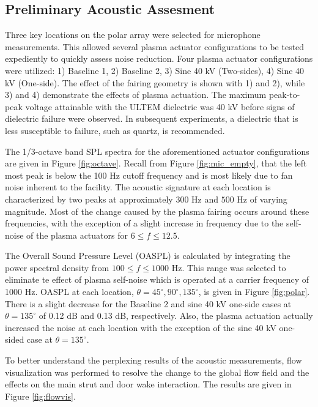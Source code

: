 \subsection{Preliminary Acoustic Assesment}
Three key locations on the polar array were selected for microphone measurements. This allowed several plasma actuator configurations to be tested expediently to quickly assess noise reduction. Four plasma actuator configurations were utilized: 1) Baseline 1, 2) Baseline 2, 3) Sine 40 kV (Two-sides), 4) Sine 40 kV (One-side). The effect of the fairing geometry is shown with 1) and 2), while 3) and 4) demonstrate the effects of plasma actuation. The maximum peak-to-peak voltage attainable with the ULTEM dielectric was 40 kV before signs of dielectric failure were observed. In subsequent experiments, a dielectric that is less susceptible to failure, such as quartz, is recommended. 

The 1/3-octave band SPL spectra for the aforementioned actuator configurations are given in Figure \ref{fig:octave}. Recall from Figure \ref{fig:mic_empty}, that the left most peak is below the 100 Hz cutoff frequency and is most likely due to fan noise inherent to the facility. The acoustic signature at each location is characterized by two peaks at approximately $300$ Hz and $500$ Hz of varying magnitude. Most of the change caused by the plasma fairing occurs around these frequencies, with the exception of a slight increase in frequency due to the self-noise of the plasma actuators for $6 \leq f \leq 12.5$. 

The Overall Sound Pressure Level (OASPL) is calculated by integrating the power spectral density from $100 \leq f \leq 1000$ Hz. This range was selected to eliminate te effect of plasma self-noise which is operated at a carrier frequency of 1000 Hz. OASPL at each location, $\theta = 45^\circ, 90^\circ, 135^\circ$, is given in Figure \ref{fig:polar}. There is a slight decrease for the Baseline 2 and sine 40 kV one-side cases at $\theta = 135^\circ$ of 0.12 dB and 0.13 dB, respectively. Also, the plasma actuation actually increased the noise at each location with the exception of the sine 40 kV one-sided case at $\theta = 135^\circ$. 

To better understand the perplexing results of the acoustic measurements, flow visualization was performed to resolve the change to the global flow field and the effects on the main strut and door wake interaction. The results are given in Figure \ref{fig:flowvis}.  

